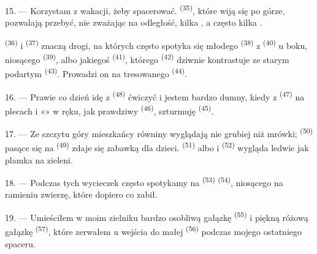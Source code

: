 \VUsaut{3.0mm}
\VUsaut{3.0mm}

15. --- Korzystam z wakacji, żeby  spacerować. 
\textsuperscript{(35)}, które wiją się po górze, pozwalają przebyć, nie zważając na
odległość, kilka , a często kilka .

 \textsuperscript{(36)} i 
\textsuperscript{(37)} znaczą drogi, na których często spotyka się młodego
 \textsuperscript{(38)} z  \textsuperscript{(40)} u boku,
niosącego  \textsuperscript{(39)}, albo jakiegoś 
\textsuperscript{(41)}, którego  \textsuperscript{(42)} dziwnie
kontrastuje ze starym podartym  \textsuperscript{(43)}. Prowadzi on na
 tresowanego  \textsuperscript{(44)}.

\VUsaut{3.0mm}

16. --- Prawie co dzień idę z  \textsuperscript{(48)} ćwiczyć
 i jestem bardzo dumny, kiedy z 
\textsuperscript{(47)} na plecach i «» w ręku, jak prawdziwy
 \textsuperscript{(46)}, szturmuję  \textsuperscript{(45)}.

17. --- Ze szczytu góry mieszkańcy równiny wyglądają nie grubiej niż mrówki;
 \textsuperscript{(50)} pasące się na 
\textsuperscript{(49)} zdaje się zabawką dla dzieci. 
\textsuperscript{(51)} albo i  \textsuperscript{(52)} wygląda
ledwie jak plamka na zieleni.

18. --- Podczas tych wycieczek często spotykamy na 
\textsuperscript{(53)}  \textsuperscript{(54)}, niosącego na ramieniu
zwierzę, które dopiero co zabił.

19. --- Umieściłem w moim zielniku bardzo osobliwą gałązkę 
\textsuperscript{(55)} i piękną różową gałązkę  \textsuperscript{(57)},
które zerwałem u wejścia do małej  \textsuperscript{(56)} podczas mojego
ostatniego spaceru.

\VUsaut{3.0mm}
\VUsaut{3.0mm}

